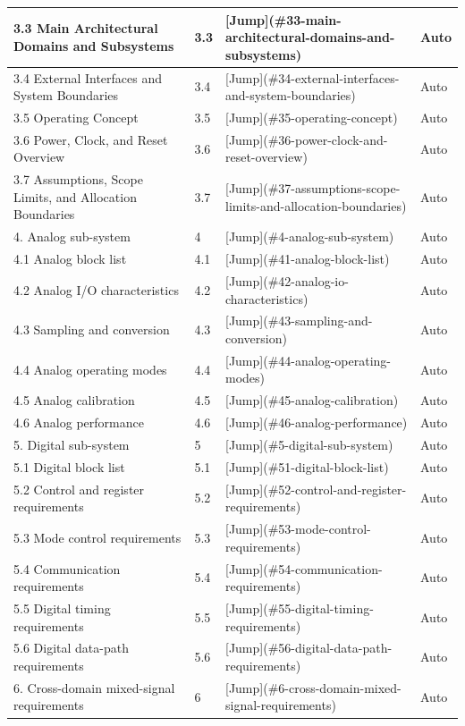 \documentclass[11pt]{article}
\begin{document}
\begin{longtable}{|p{}|p{}|p{}|p{}|}
\hline
3.3 Main Architectural Domains and Subsystems & 3.3 & [Jump](\#33-main-architectural-domains-and-subsystems) & Auto \\
\hline
3.4 External Interfaces and System Boundaries & 3.4 & [Jump](\#34-external-interfaces-and-system-boundaries) & Auto \\
\hline
3.5 Operating Concept & 3.5 & [Jump](\#35-operating-concept) & Auto \\
\hline
3.6 Power, Clock, and Reset Overview & 3.6 & [Jump](\#36-power-clock-and-reset-overview) & Auto \\
\hline
3.7 Assumptions, Scope Limits, and Allocation Boundaries & 3.7 & [Jump](\#37-assumptions-scope-limits-and-allocation-boundaries) & Auto \\
\hline
4. Analog sub-system & 4 & [Jump](\#4-analog-sub-system) & Auto \\
\hline
4.1 Analog block list & 4.1 & [Jump](\#41-analog-block-list) & Auto \\
\hline
4.2 Analog I/O characteristics & 4.2 & [Jump](\#42-analog-io-characteristics) & Auto \\
\hline
4.3 Sampling and conversion & 4.3 & [Jump](\#43-sampling-and-conversion) & Auto \\
\hline
4.4 Analog operating modes & 4.4 & [Jump](\#44-analog-operating-modes) & Auto \\
\hline
4.5 Analog calibration & 4.5 & [Jump](\#45-analog-calibration) & Auto \\
\hline
4.6 Analog performance & 4.6 & [Jump](\#46-analog-performance) & Auto \\
\hline
5. Digital sub-system & 5 & [Jump](\#5-digital-sub-system) & Auto \\
\hline
5.1 Digital block list & 5.1 & [Jump](\#51-digital-block-list) & Auto \\
\hline
5.2 Control and register requirements & 5.2 & [Jump](\#52-control-and-register-requirements) & Auto \\
\hline
5.3 Mode control requirements & 5.3 & [Jump](\#53-mode-control-requirements) & Auto \\
\hline
5.4 Communication requirements & 5.4 & [Jump](\#54-communication-requirements) & Auto \\
\hline
5.5 Digital timing requirements & 5.5 & [Jump](\#55-digital-timing-requirements) & Auto \\
\hline
5.6 Digital data-path requirements & 5.6 & [Jump](\#56-digital-data-path-requirements) & Auto \\
\hline
6. Cross-domain mixed-signal requirements & 6 & [Jump](\#6-cross-domain-mixed-signal-requirements) & Auto \\

\end{longtable}
\end{document}
